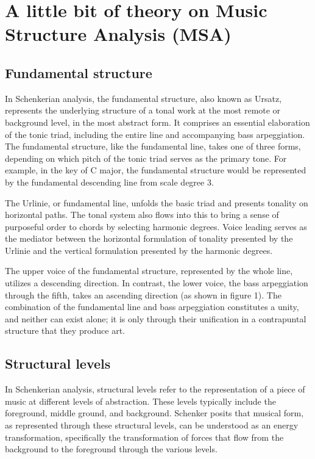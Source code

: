 \chapter{A little bit of theory on Music Structure Analysis (MSA)}

\section{Fundamental structure}

In Schenkerian analysis, the fundamental structure, also known as Ursatz, represents the underlying structure of a tonal work at the most remote or background level, in the most abstract form. It comprises an essential elaboration of the tonic triad, including the entire line and accompanying bass arpeggiation. The fundamental structure, like the fundamental line, takes one of three forms, depending on which pitch of the tonic triad serves as the primary tone. For example, in the key of C major, the fundamental structure would be represented by the fundamental descending line from scale degree 3.

The Urlinie, or fundamental line, unfolds the basic triad and presents tonality on horizontal paths. The tonal system also flows into this to bring a sense of purposeful order to chords by selecting harmonic degrees. Voice leading serves as the mediator between the horizontal formulation of tonality presented by the Urlinie and the vertical formulation presented by the harmonic degrees.

The upper voice of the fundamental structure, represented by the whole line, utilizes a descending direction. In contrast, the lower voice, the bass arpeggiation through the fifth, takes an ascending direction (as shown in figure 1). The combination of the fundamental line and bass arpeggiation constitutes a unity, and neither can exist alone; it is only through their unification in a contrapuntal structure that they produce art.

\section{Structural levels}

In Schenkerian analysis, structural levels refer to the representation of a piece of music at different levels of abstraction. These levels typically include the foreground, middle ground, and background. Schenker posits that musical form, as represented through these structural levels, can be understood as an energy transformation, specifically the transformation of forces that flow from the background to the foreground through the various levels.

